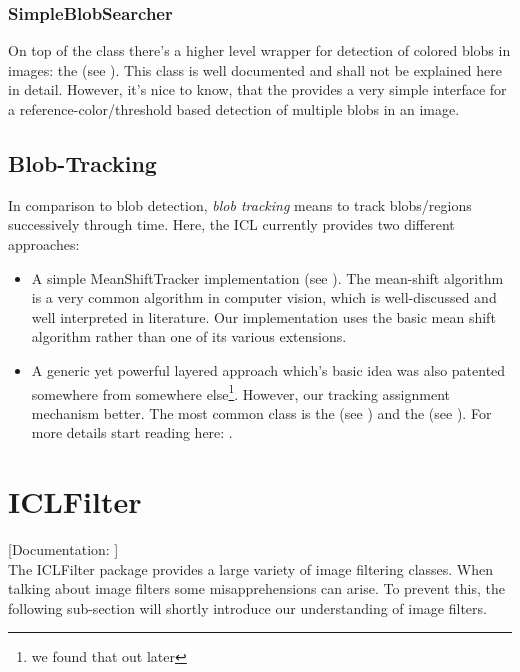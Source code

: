 \subsubsection{SimpleBlobSearcher}

On top of the  class there's a higher level wrapper for detection of colored blobs in images: the  (see ). This class is well documented and shall not be explained here in detail. However, it's nice to know, that the  provides a very simple interface for a reference-color/threshold based detection of multiple blobs in an image.

\subsection{Blob-Tracking}

In comparison to blob detection, \emph{blob tracking} means to track blobs/regions successively through time. Here, the ICL currently provides two different approaches: 
\begin{itemize}
\item A simple MeanShiftTracker implementation (see ). The mean-shift algorithm is a very common algorithm in computer vision, which is well-discussed and well interpreted in literature. Our implementation uses the basic mean shift algorithm rather than one of its various extensions.
\item A generic yet powerful layered approach which's basic idea was also patented somewhere from somewhere else\footnote{we found that out later}. However, our tracking assignment mechanism better. The most common class is the  (see ) and the  (see ). For more details start reading here: .
\end{itemize}


\section{ICLFilter}

[Documentation: ]\\

The ICLFilter package provides a large variety of image filtering classes. When talking about image filters some misapprehensions can arise. To prevent this, the following sub-section will shortly introduce our understanding of image filters.

